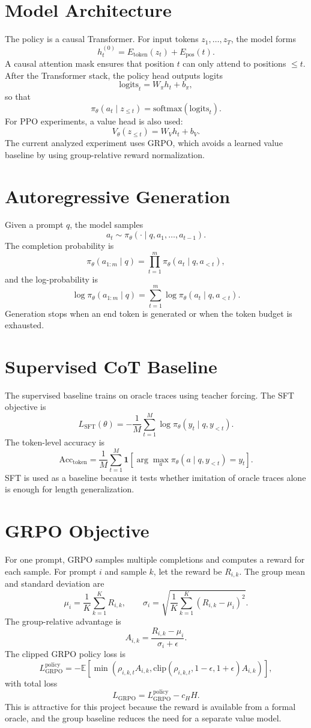 \documentclass[11pt]{article}
\begin{document}
\section{Model Architecture}
The policy is a causal Transformer. For input tokens $z_1,\dots,z_T$, the model forms
\[
h_t^{(0)} = E_{\mathrm{token}}(z_t) + E_{\mathrm{pos}}(t).
\]
A causal attention mask ensures that position $t$ can only attend to positions $\leq t$. After the Transformer stack, the policy head outputs logits
\[
\mathrm{logits}_t = W_\pi h_t + b_\pi,
\]
so that
\[
\pi_\theta(a_t \mid z_{\leq t}) = \mathrm{softmax}(\mathrm{logits}_t).
\]
For PPO experiments, a value head is also used:
\[
V_\theta(z_{\leq t}) = W_V h_t + b_V.
\]
The current analyzed experiment uses GRPO, which avoids a learned value baseline by using group-relative reward normalization.

\section{Autoregressive Generation}
Given a prompt $q$, the model samples
\[
a_t \sim \pi_\theta(\cdot \mid q,a_1,\dots,a_{t-1}).
\]
The completion probability is
\[
\pi_\theta(a_{1:m}\mid q)=\prod_{t=1}^{m}\pi_\theta(a_t\mid q,a_{<t}),
\]
and the log-probability is
\[
\log \pi_\theta(a_{1:m}\mid q)=\sum_{t=1}^{m}\log \pi_\theta(a_t\mid q,a_{<t}).
\]
Generation stops when an end token is generated or when the token budget is exhausted.

\section{Supervised CoT Baseline}
The supervised baseline trains on oracle traces using teacher forcing. The SFT objective is
\[
L_{\mathrm{SFT}}(\theta)= -\frac{1}{M}\sum_{t=1}^{M}\log \pi_\theta(y_t \mid q, y_{<t}).
\]
The token-level accuracy is
\[
\mathrm{Acc}_{\mathrm{token}} = \frac{1}{M}\sum_{t=1}^{M}\mathbf{1}\left[\arg\max_a \pi_\theta(a\mid q,y_{<t})=y_t\right].
\]
SFT is used as a baseline because it tests whether imitation of oracle traces alone is enough for length generalization.

\section{GRPO Objective}
For one prompt, GRPO samples multiple completions and computes a reward for each sample. For prompt $i$ and sample $k$, let the reward be $R_{i,k}$. The group mean and standard deviation are
\[
\mu_i = \frac{1}{K}\sum_{k=1}^{K}R_{i,k}, \qquad
\sigma_i = \sqrt{\frac{1}{K}\sum_{k=1}^{K}(R_{i,k}-\mu_i)^2}.
\]
The group-relative advantage is
\[
A_{i,k}=\frac{R_{i,k}-\mu_i}{\sigma_i+\epsilon}.
\]
The clipped GRPO policy loss is
\[
L_{\mathrm{GRPO}}^{\mathrm{policy}}= -\mathbb{E}\left[\min\left(\rho_{i,k,t}A_{i,k},
\mathrm{clip}(\rho_{i,k,t},1-\epsilon,1+\epsilon)A_{i,k}\right)\right],
\]
with total loss
\[
L_{\mathrm{GRPO}}=L_{\mathrm{GRPO}}^{\mathrm{policy}}-c_H H.
\]
This is attractive for this project because the reward is available from a formal oracle, and the group baseline reduces the need for a separate value model.
\end{document}

